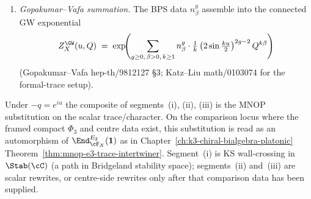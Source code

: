 \begin{theorem}
\begin{enumerate}[label=\textup{(\roman*)}]
 (Pandharipande--Thomas 2009 \textup{arXiv:0903.4155} Theorem~2 and
 Conjecture~3; theorem on toric $X$ per Konishi 2006
 \textup{arXiv:math/0608325}; theorem on primitive K3 fibre per
 Pandharipande--Thomas \emph{Forum Math.~Pi} 4, 2016; Maulik--Toda 2018
 \emph{Invent.~Math.} for projective KKV integrality). This is an
 algebraic identity inside $\End^{E_2}_{\cF_X}(\mathbf{1})$, not a
 Bridgeland chamber crossing.
\item \emph{Gopakumar--Vafa summation.} The BPS data $n^{g}_\beta$
 assemble into the connected GW exponential
 \[
 Z^{\GW}_X(u, Q)
 \;=\;
 \exp\!\Biggl(
 \sum_{g\geq 0,\,\beta > 0,\,k\geq 1}
 n^{g}_\beta \cdot \tfrac{1}{k}\,
 \bigl(2\sin\tfrac{k u}{2}\bigr)^{2g-2}\,
 Q^{k\beta}
 \Biggr)
 \]
 (Gopakumar--Vafa \textup{hep-th/9812127} \S3; Katz--Liu
 \textup{math/0103074} for the formal-trace setup).
\end{enumerate}
Under $-q = e^{iu}$ the composite of segments~(i), (ii), (iii) is the
MNOP substitution on the scalar trace/character. On the comparison
locus where the framed compact $\Phi_3$ and centre data exist, this
substitution is read as an automorphism of
$\End^{E_2}_{\cF_X}(\mathbf{1})$ as in
Chapter~\ref{ch:k3-chiral-bialgebra-platonic}
Theorem~\ref{thm:mnop-e3-trace-intertwiner}. Segment~(i) is KS
wall-crossing in $\Stab(\cC)$ (a path in Bridgeland stability space);
segments~(ii) and~(iii) are scalar rewrites, or centre-side rewrites
only after that comparison data has been supplied.
\end{theorem}


